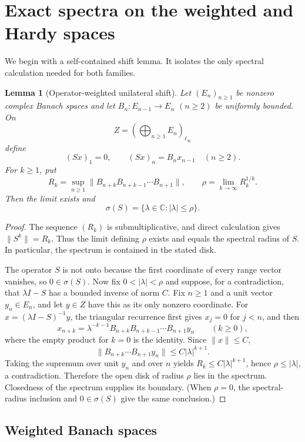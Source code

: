 \documentclass[11pt]{article}
\newtheorem{lemma}[theorem]{Lemma}
\newcommand{\spec}{\sigma}
\begin{document}
\section{Exact spectra on the weighted and Hardy spaces}

We begin with a self-contained shift lemma. It isolates the only spectral
calculation needed for both families.

\begin{lemma}[Operator-weighted unilateral shift]\label{lem:shift-spectrum}
Let $(E_n)_{n\ge1}$ be nonzero complex Banach spaces and let
$B_n:E_{n-1}\to E_n$ $(n\ge2)$ be uniformly bounded. On
\[
  Z=\left(\bigoplus_{n\ge1}E_n\right)_{\ell_\infty}
\]
define
\[
  (Sx)_1=0,\qquad (Sx)_n=B_nx_{n-1}\quad(n\ge2).
\]
For $k\ge1$, put
\[
  R_k=\sup_{n\ge1}\|B_{n+k}B_{n+k-1}\cdots B_{n+1}\|,
  \qquad
  \rho=\lim_{k\to\infty}R_k^{1/k}.
\]
Then the limit exists and
\[
  \spec(S)=\{\lambda\in\mathbb C:|\lambda|\le\rho\}.
\]
\end{lemma}

\begin{proof}
The sequence $(R_k)$ is submultiplicative, and direct calculation gives
$\|S^k\|=R_k$. Thus the limit defining $\rho$ exists and equals the spectral
radius of $S$. In particular, the spectrum is contained in the stated disk.

The operator $S$ is not onto because the first coordinate of every range
vector vanishes, so $0\in\spec(S)$. Now fix $0<|\lambda|<\rho$ and suppose,
for a contradiction, that $\lambda I-S$ has a bounded inverse of norm $C$.
Fix $n\ge1$ and a unit vector $y_n\in E_n$, and let $y\in Z$ have this as its
only nonzero coordinate. For $x=(\lambda I-S)^{-1}y$, the triangular
recurrence first gives $x_j=0$ for $j<n$, and then
\[
  x_{n+k}=\lambda^{-k-1}
  B_{n+k}B_{n+k-1}\cdots B_{n+1}y_n
  \qquad(k\ge0),
\]
where the empty product for $k=0$ is the identity. Since $\|x\|\le C$,
\[
  \|B_{n+k}\cdots B_{n+1}y_n\|
  \le C|\lambda|^{k+1}.
\]
Taking the supremum over unit $y_n$ and over $n$ yields
$R_k\le C|\lambda|^{k+1}$, hence $\rho\le|\lambda|$, a contradiction.
Therefore the open disk of radius $\rho$ lies in the spectrum. Closedness of
the spectrum supplies its boundary. (When $\rho=0$, the spectral-radius
inclusion and $0\in\spec(S)$ give the same conclusion.)
\end{proof}

\subsection{Weighted Banach spaces}
\end{document}
